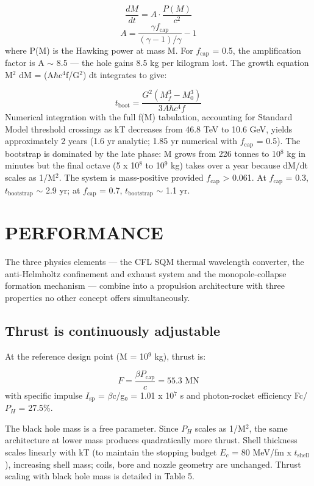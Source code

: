 \documentclass[12pt,a4paper]{article}
\begin{document}
\begin{equation}
\frac{dM}{dt} = A \cdot \frac{P(M)}{c^2}
\end{equation}
\begin{equation}
A = \frac{\gamma f_\text{cap}}{(\gamma - 1)/\gamma} - 1
\end{equation}
where P(M) is the Hawking power at mass M. For $f_{\text{cap}}$ = 0.5, the amplification factor is A $\sim$ 8.5 --- the hole gains 8.5 kg per kilogram lost. The growth equation M$^{2}$ dM = (A$\hbar$c$^{4}$f/G$^{2}$) dt integrates to give:

\begin{equation}
t_\text{boot} = \frac{G^2(M_f^3 - M_0^3)}{3A\hbar c^4 f}
\end{equation}
Numerical integration with the full f(M) tabulation, accounting for Standard Model threshold crossings as kT decreases from 46.8 TeV to 10.6 GeV, yields approximately 2 years (1.6 yr analytic; 1.85 yr numerical with $f_{\text{cap}}$ = 0.5). The bootstrap is dominated by the late phase: M grows from 226 tonnes to 10$^{8}$ kg in minutes but the final octave (5 x 10$^{8}$ to 10$^{9}$ kg) takes over a year because dM/dt scales as 1/M$^{2}$. The system is mass-positive provided $f_{\text{cap}}$ > 0.061. At $f_{\text{cap}}$ = 0.3, $t_{\text{bootstrap}}$ $\sim$ 2.9 yr; at $f_{\text{cap}}$ = 0.7, $t_{\text{bootstrap}}$ $\sim$ 1.1 yr.

\section{PERFORMANCE}
The three physics elements --- the CFL SQM thermal wavelength converter, the anti-Helmholtz confinement and exhaust system and the monopole-collapse formation mechanism --- combine into a propulsion architecture with three properties no other concept offers simultaneously.

\subsection{Thrust is continuously adjustable}
At the reference design point (M = 10$^{9}$ kg), thrust is:

\begin{equation}
F = \frac{\beta P_\text{cap}}{c} = 55.3 \text{ MN}
\end{equation}
with specific impulse $I_{\text{sp}}$ = $\beta$c/g₀ = 1.01 x 10$^{7}$ s and photon-rocket efficiency Fc/$P_H$ = 27.5\%.

The black hole mass is a free parameter. Since $P_H$ scales as 1/M$^{2}$, the same architecture at lower mass produces quadratically more thrust. Shell thickness scales linearly with kT (to maintain the stopping budget $E_c$ = 80 MeV/fm x $t_{\text{shell}}$), increasing shell mass; coils, bore and nozzle geometry are unchanged. Thrust scaling with black hole mass is detailed in Table 5.
\end{document}
